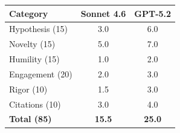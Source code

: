 \documentclass[11pt]{article}
\begin{document}
\medskip

\begin{tabular}{lcc}
\toprule
\textbf{Category} & \textbf{Sonnet 4.6} & \textbf{GPT-5.2} \\
\midrule
Hypothesis (15) & 3.0 & 6.0 \\
Novelty (15) & 5.0 & 7.0 \\
Humility (15) & 1.0 & 2.0 \\
Engagement (20) & 2.0 & 3.0 \\
Rigor (10) & 1.5 & 3.0 \\
Citations (10) & 3.0 & 4.0 \\
\midrule
\textbf{Total (85)} & \textbf{15.5} & \textbf{25.0} \\
\bottomrule
\end{tabular}

\bigskip
\end{document}
